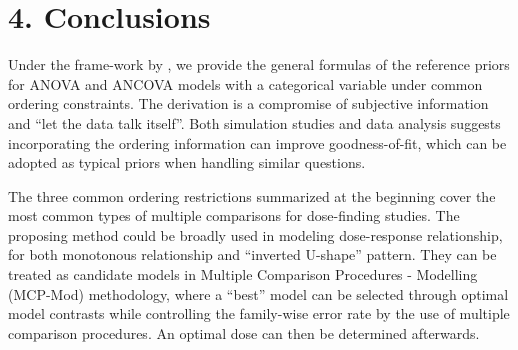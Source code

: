 \documentclass[Proceedings]{ascelike}
\begin{document}
\section{4. Conclusions}
Under the frame-work by \cite{BergerBernardo1992}, we provide the general formulas of the reference priors for ANOVA and ANCOVA models with a categorical variable under common ordering constraints. The derivation is a compromise of subjective information and ``let the data talk itself''. Both simulation studies and data analysis suggests incorporating the ordering information can improve goodness-of-fit, which can be adopted as typical priors when handling similar questions.

The three common ordering restrictions summarized at the beginning cover the most common types of multiple comparisons for dose-finding studies. The proposing method could be broadly used in modeling dose-response relationship, for both monotonous relationship and ``inverted U-shape'' pattern. They can be treated as candidate models in Multiple Comparison Procedures - Modelling (MCP-Mod) methodology, where a ``best'' model can be selected through optimal model contrasts while controlling the family-wise error rate by the use of multiple comparison procedures. An optimal dose can then be determined afterwards.

\pagebreak
%
%
%
\appendix\label{section:references}
%
%

%
%
%
\end{document}
